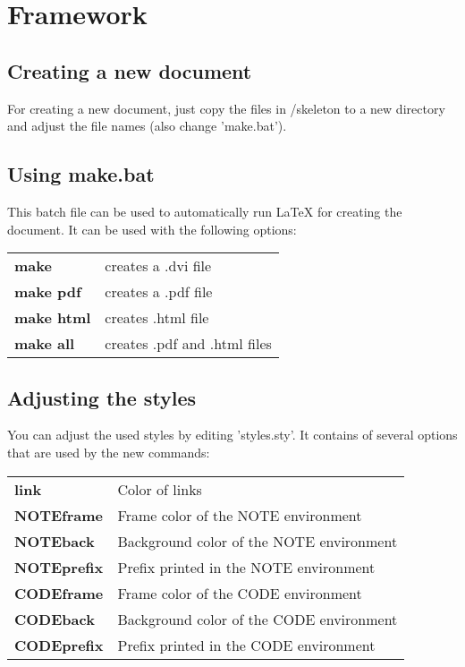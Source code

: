 \section{Framework}


\subsection{Creating a new document}
For creating a new document, just copy the files in /skeleton to a new directory and adjust
the file names (also change 'make.bat').


\subsection{Using make.bat}
This batch file can be used to automatically run LaTeX for creating the document. It can be used
with the following options:\\

\begin{tabular}{ll}
\textbf{make}      & creates a .dvi file\\
\textbf{make pdf}  & creates a .pdf file\\
\textbf{make html} & creates .html file\\
\textbf{make all}  & creates .pdf and .html files\\
\end{tabular}


\subsection{Adjusting the styles}
You can adjust the used styles by editing 'styles.sty'. It contains of several options that are
used by the new commands:\\

\begin{tabular}{ll}
\textbf{link}       & Color of links \\
\textbf{NOTEframe}  & Frame color of the NOTE environment \\
\textbf{NOTEback}   & Background color of the NOTE environment \\
\textbf{NOTEprefix} & Prefix printed in the NOTE environment \\
\textbf{CODEframe}  & Frame color of the CODE environment \\
\textbf{CODEback}   & Background color of the CODE environment \\
\textbf{CODEprefix} &Prefix printed in the CODE environment \\
\end{tabular}
